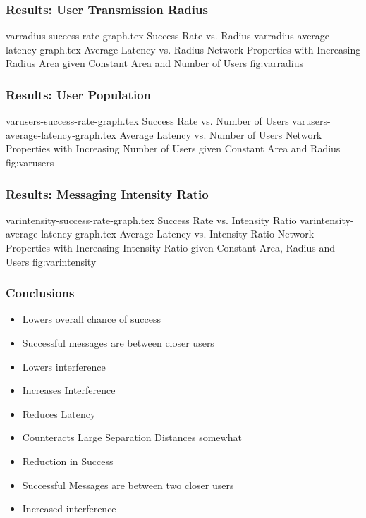 \begin{frame}
    \frametitle{Results: User Transmission Radius}
\sidebysidefigures
{varradius-success-rate-graph.tex}     {Success Rate vs. Radius}
{varradius-average-latency-graph.tex}  {Average Latency vs. Radius}
{Network Properties with Increasing Radius Area given Constant Area and Number of Users}
{fig:varradius}

\end{frame}

\begin{frame}
    \frametitle{Results: User Population}
\sidebysidefigures
{varusers-success-rate-graph.tex}      {Success Rate vs. Number of Users}
{varusers-average-latency-graph.tex}   {Average Latency vs. Number of Users}
{Network Properties with Increasing Number of Users given Constant Area and Radius}
{fig:varusers}

\end{frame}

\begin{frame}
    \frametitle{Results: Messaging Intensity Ratio}
\sidebysidefigures
{varintensity-success-rate-graph.tex}      {Success Rate vs. Intensity Ratio}
{varintensity-average-latency-graph.tex}   {Average Latency vs. Intensity Ratio}
{Network Properties with Increasing Intensity Ratio given Constant Area, Radius and Users}
{fig:varintensity}

\end{frame}

\begin{frame}
    \frametitle{Conclusions}

    \begin{itemize}
        \item Lowers overall chance of success
        \item Successful messages are between closer users
        \item Lowers interference\\[0.5cm]
    \end{itemize}
    
    \begin{itemize}
        \item Increases Interference
        \item Reduces Latency
        \item Counteracts Large Separation Distances somewhat\\[0.5cm]
    \end{itemize}
    
    \begin{itemize}
        \item Reduction in Success
        \item Successful Messages are between two closer users
        \item Increased interference
    \end{itemize}

\end{frame}

